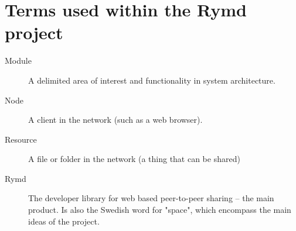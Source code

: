 \section{Terms used within the Rymd project}
\begin{description}
  \item[Module] A delimited area of interest and functionality in system architecture.
  \item[Node] A client in the network (such as a web browser).
  \item[Resource] A file or folder in the network (a thing that can be shared)
  \item[Rymd] The developer library for web based peer-to-peer sharing – the main product. Is also the Swedish word for "space", which encompass the main ideas of the project.
\end{description}
